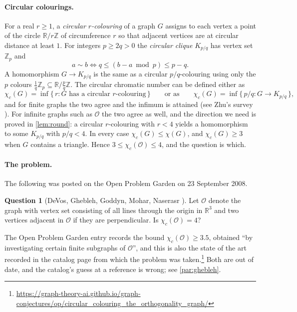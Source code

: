 \documentclass[11pt,a4paper]{article}
\theoremstyle{plain}
\theoremstyle{definition}
\newtheorem{question}[theorem]{Question}
\theoremstyle{remark}
\newcommand{\cO}{\mathcal O}
\newcommand{\R}{\mathbb R}
\newcommand{\Z}{\mathbb Z}
\newcommand{\chic}{\chi_c}
\newcommand{\Kc}[2]{K_{#1/#2}}
\begin{document}
\paragraph{Circular colourings.} For a real $r\ge1$, a \emph{circular $r$-colouring} of a graph $G$ assigns to each vertex a point of the circle $\R/r\Z$ of circumference $r$ so that adjacent vertices are at circular distance at least $1$. For integers $p\ge2q>0$ the \emph{circular clique} $\Kc pq$ has vertex set $\Z_p$ and
\[
a\sim b \iff q\le (b-a \bmod p)\le p-q .
\]
A homomorphism $G\to\Kc pq$ is the same as a circular $p/q$-colouring using only the $p$ colours $\tfrac1q\Z_p\subseteq\R/\tfrac pq\Z$. The circular chromatic number can be defined either as
\[
\chic(G)=\inf\{\,r : G \text{ has a circular } r\text{-colouring}\,\}
\qquad\text{or as}\qquad
\chic(G)=\inf\{\,p/q : G\to\Kc pq\,\},
\]
and for finite graphs the two agree and the infimum is attained (see Zhu's survey \cite{Zhu01}). For infinite graphs such as $\cO$ the two agree as well, and the direction we need is proved in \cref{lem:round}: a circular $r$-colouring with $r<4$ yields a homomorphism to some $\Kc pq$ with $p/q<4$. In every case $\chic(G)\le\chi(G)$, and $\chic(G)\ge3$ when $G$ contains a triangle. Hence $3\le\chic(\cO)\le4$, and the question is which.

\paragraph{The problem.} The following was posted on the Open Problem Garden on 23 September 2008.

\begin{question}[{DeVos, Ghebleh, Goddyn, Mohar, Naserasr \cite{OPG}}]\label{q:opg}
Let ${\mathcal O}$ denote the graph with vertex set consisting of all lines through the origin in ${\mathbb R}^3$ and two vertices adjacent in ${\mathcal O}$ if they are perpendicular. Is $\chi_c({\mathcal O}) = 4$?
\end{question}

The Open Problem Garden entry records the bound $\chic(\cO)\ge 3.5$, obtained ``by investigating certain finite subgraphs of $\cO$'', and this is also the state of the art recorded in the catalog page from which the problem was taken.\footnote{\url{https://graph-theory-ai.github.io/graph-conjectures/op/circular_colouring_the_orthogonality_graph/}} Both are out of date, and the catalog's guess at a reference is wrong; see \cref{par:ghebleh}.
\end{document}
